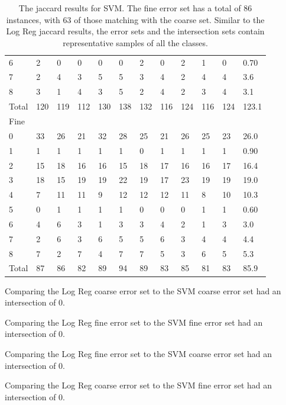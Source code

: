 \documentclass[ms]{nuthesis}
\begin{document}
\begin{table}[h]
\begin{tabular}{|l||l||l||l||l||l||l||l||l||l||l||l|}
    6 & 2 & 0 & 0 & 0 & 0 & 2 & 0 & 2 & 1 & 0 & 0.70 \\
    7 & 2 & 4 & 3 & 5 & 5 & 3 & 4 & 2 & 4 & 4 & 3.6 \\
    8 & 3 & 1 & 4 & 3 & 5 & 2 & 4 & 2 & 3 & 4 & 3.1 \\
    Total & 120 & 119 & 112 & 130 & 138 & 132 & 116 & 124 & 116 & 124 & 123.1 \\
    Fine &  &  &  &  &  &  &  &  &  &  &  \\
    0 & 33 & 26 & 21 & 32 & 28 & 25 & 21 & 26 & 25 & 23 & 26.0 \\
    1 & 1 & 1 & 1 & 1 & 1 & 0 & 1 & 1 & 1 & 1 & 0.90 \\
    2 & 15 & 18 & 16 & 16 & 15 & 18 & 17 & 16 & 16 & 17 & 16.4 \\
    3 & 18 & 15 & 19 & 19 & 22 & 19 & 17 & 23 & 19 & 19 & 19.0 \\
    4 & 7 & 11 & 11 & 9 & 12 & 12 & 12 & 11 & 8 & 10 & 10.3 \\
    5 & 0 & 1 & 1 & 1 & 1 & 0 & 0 & 0 & 1 & 1 & 0.60 \\
    6 & 4 & 6 & 3 & 1 & 3 & 3 & 4 & 2 & 1 & 3 & 3.0 \\
    7 & 2 & 6 & 3 & 6 & 5 & 5 & 6 & 3 & 4 & 4 & 4.4 \\
    8 & 7 & 2 & 7 & 4 & 7 & 7 & 5 & 3 & 6 & 5 & 5.3 \\
    Total & 87 & 86 & 82 & 89 & 94 & 89 & 83 & 85 & 81 & 83 & 85.9 \\ \bottomrule
  \end{tabular}
  \caption{The jaccard results for SVM. The fine error set has a total of 86 instances, with
  63 of those matching with the coarse set. Similar to the Log Reg jaccard results,
  the error sets and the intersection sets contain representative samples of all the classes.}
  \label{tab:SVM}
\end{table}
\FloatBarrier


\par Comparing the Log Reg coarse error set to the SVM coarse error set had
an intersection of 0.

\par Comparing the Log Reg fine error set to the SVM fine error set had
an intersection of 0.

\par Comparing the Log Reg fine error set to the SVM coarse error set had
an intersection of 0.

\par Comparing the Log Reg coarse error set to the SVM fine error set had
an intersection of 0.
\end{document}
